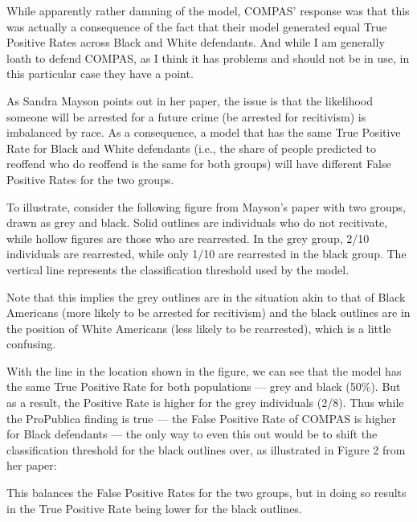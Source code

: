 \documentclass[letterpaper,10pt,english]{jupyterBook}
\begin{document}
\sphinxAtStartPar
While apparently rather damning of the model, COMPAS’ response was that this was actually a consequence of the fact that their model generated equal True Positive Rates across Black and White defendants. And while I am generally loath to defend COMPAS, as I think it has  problems and should not be in use, in this particular case they have a point.

\sphinxAtStartPar
As Sandra Mayson points out in her paper, the issue is that the likelihood someone will be arrested for a future crime (be arrested for recitivism) is imbalanced by race. As a consequence, a model that has the same True Positive Rate for Black and White defendants (i.e., the share of people predicted to re\sphinxhyphen{}offend who do re\sphinxhyphen{}offend is the same for both groups) will  have different False Positive Rates for the two groups.

\sphinxAtStartPar
To illustrate, consider the following figure from Mayson’s paper with two groups, drawn as grey and black. Solid outlines are individuals who do not recitivate, while hollow figures are those who are re\sphinxhyphen{}arrested. In the grey group, 2/10 individuals are re\sphinxhyphen{}arrested, while only 1/10 are re\sphinxhyphen{}arrested in the black group. The vertical line represents the classification threshold used by the model.

\sphinxAtStartPar
Note that this implies the grey outlines are in the situation akin to that of Black Americans (more likely to be arrested for recitivism) and the black outlines are in the position of White Americans (less likely to be rearrested), which is a little confusing.

\sphinxAtStartPar
{}

\sphinxAtStartPar
With the line in the location shown in the figure, we can see that the model has the same True Positive Rate for both populations — grey and black (50\%). But as a result, the  Positive Rate is higher for the grey individuals (2/8). Thus while the ProPublica finding is true — the False Positive Rate of COMPAS is higher for Black defendants — the only way to even this out would be to shift the classification threshold for the black outlines over, as illustrated in Figure 2 from her paper:

\sphinxAtStartPar
{}

\sphinxAtStartPar
This balances the False Positive Rates for the two groups, but in doing so results in the True Positive Rate being lower for the black outlines.
\end{document}
